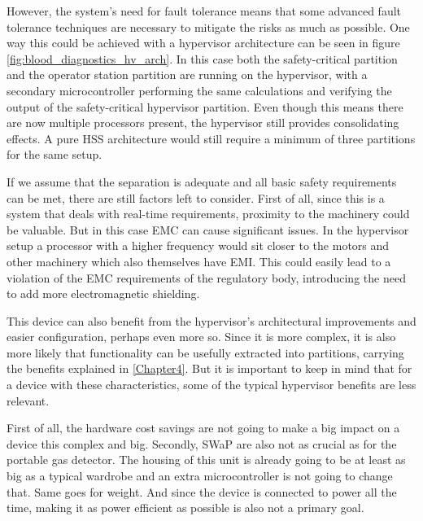 However, the system's need for fault tolerance means that some advanced fault tolerance techniques are necessary to mitigate the risks as much as possible. One way this could be achieved with a hypervisor architecture can be seen in figure \ref{fig:blood_diagnostics_hv_arch}. In this case both the safety-critical partition and the operator station partition are running on the hypervisor, with a secondary microcontroller performing the same calculations and verifying the output of the safety-critical hypervisor partition. Even though this means there are now multiple processors present, the hypervisor still provides consolidating effects. A pure \gls{HSS} architecture would still require a minimum of three partitions for the same setup.

If we assume that the separation is adequate and all basic safety requirements can be met, there are still factors left to consider. First of all, since this is a system that deals with real-time requirements, proximity to the machinery could be valuable. But in this case \gls{EMC} can cause significant issues. In the hypervisor setup a processor with a higher frequency would sit closer to the motors and other machinery which also themselves have \gls{EMI}. This could easily lead to a violation of the \gls{EMC} requirements of the regulatory body, introducing the need to add more electromagnetic shielding. 

This device can also benefit from the hypervisor's architectural improvements and easier configuration, perhaps even more so. Since it is more complex, it is also more likely that functionality can be usefully extracted into partitions, carrying the benefits explained in \ref{Chapter4}. But it is important to keep in mind that for a device with these characteristics, some of the typical hypervisor benefits are less relevant.

First of all, the hardware cost savings are not going to make a big impact on a device this complex and big. Secondly, \gls{SWaP} are also not as crucial as for the portable gas detector. The housing of this unit is already going to be at least as big as a typical wardrobe and an extra microcontroller is not going to change that. Same goes for weight. And since the device is connected to power all the time, making it as power efficient as possible is also not a primary goal.


